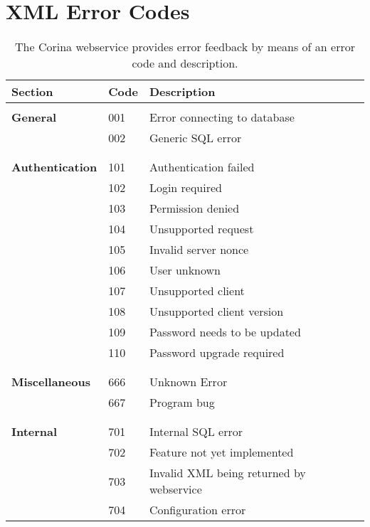 \chapter{XML Error Codes}
\label{txt:errorcodes}
\begin{longtable}{lll}
  \caption{The Corina webservice provides error feedback by means of an error code and description.}\\
  \toprule
  \textbf{Section} & \textbf{Code} & \textbf{Description} \\
  \endhead
  \midrule
  & & \\

  \textbf{General}
  & 001 & Error connecting to database \\
  & 002 & Generic SQL error \\
  
  & & \\
  \midrule
  & & \\
  
  \textbf{Authentication}
  & 101 & Authentication failed \\
  & 102 & Login required \\
  & 103 & Permission denied \\
  & 104 & Unsupported request \\
  & 105 & Invalid server nonce \\
  & 106 & User unknown \\
  & 107 & Unsupported client \\
  & 108 & Unsupported client version \\
  & 109 & Password needs to be updated \\
  & 110 & Password upgrade required \\

  & & \\
  \midrule
  & & \\

  \textbf{Miscellaneous} 
  & 666 & Unknown Error \\
  & 667 & Program bug \\

  & & \\
  \midrule
  & & \\

  \textbf{Internal} 
  & 701 & Internal SQL error \\
  & 702 & Feature not yet implemented \\
  & 703 & Invalid XML being returned by webservice \\
  & 704 & Configuration error \\


\end{longtable}
